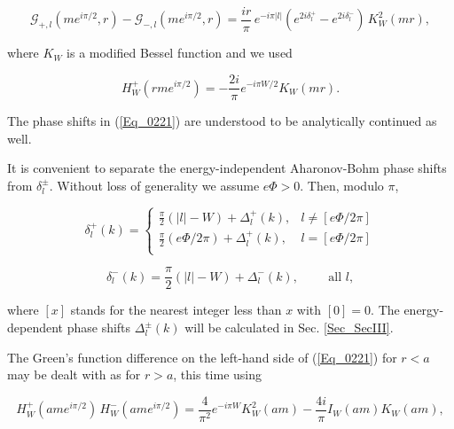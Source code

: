 \documentclass[a4paper,twocolumn,showpacs,preprintnumbers,amsmath,amssymb]{revtex4}
\newcommand{\gap}{\vspace{3mm}}
\begin{document}
\begin{widetext}
\begin{equation}
\label{Eq_0221}
\mathcal{G}_{+,l}(me^{i\pi/2}, r) - \mathcal{G}_{-,l}(me^{i\pi/2},r)
  = \frac{ir}{\pi} \, e^{-i\pi|l|}
  (e^{2i\delta^{+}_l} - e^{2i\delta^{-}_l}) \, K^2_W(mr),
\end{equation}
\end{widetext}

\noindent
where $K_W$ is a modified Bessel function and we used~\cite{Abramowitz64}

\begin{equation}
\label{Eq_0222}
H^{+}_W(rme^{i\pi/2}) = - \frac{2i}{\pi} e^{-i\pi W/2} K_W(mr).
\end{equation}

\noindent
The phase shifts in (\ref{Eq_0221}) are understood to be analytically
continued as well.

It is convenient to separate the energy-independent Aharonov-Bohm
phase shifts~\cite{Musto86,Jaroszewicz86} from
$\delta^{\pm}_l$. Without loss of generality we assume
$e \Phi > 0$. Then, modulo $\pi$,

\begin{equation}
\label{Eq_0223}
\delta^{+}_l(k) =
\begin{cases}
\displaystyle
\frac{\pi}{2}(|l| - W) + \Delta^{+}_l(k),& l \neq [e\Phi/2\pi]\\[5mm]
\displaystyle
\frac{\pi}{2}(e\Phi/2\pi) + \Delta^{+}_l(k),& l = [e\Phi/2\pi]\\
\end{cases}
\end{equation}

\gap
\gap

\begin{equation}
\label{Eq_0224}
\delta^{-}_l(k) = \frac{\pi}{2}(|l| - W) + \Delta^{-}_l(k),
	\hspace{1cm} \text{all } l,
\end{equation}

\noindent
where $[x]$ stands for the nearest integer less than $x$ with $[0] =
0$. The energy-dependent phase shifts $\Delta^{\pm}_l(k)$ will be
calculated in Sec. \ref{Sec_SecIII}.

The Green's function difference on the left-hand side of
(\ref{Eq_0221}) for $r < a$ may be dealt with as for $r > a$, this
time using ~\cite{Abramowitz64}

\begin{widetext}
\begin{equation}
\label{Eq_0225}
H^{+}_W(ame^{i\pi/2}) \, H^{-}_W(ame^{i\pi/2})
  = \frac{4}{\pi^2} e^{-i\pi W} K^2_W (am) - \frac{4i}{\pi} I_W(am) K_W(am), 
\end{equation}
\end{widetext}
\end{document}
